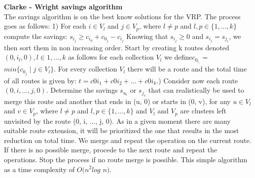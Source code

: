 \documentclass{article}
\begin{document}
\textbf{Clarke - Wright savings algorithm}\\
The savings algorithm is on the best know solutions for the VRP.
The process goes as follows:
1) For each $i \in V_l$ and $j \in V_p$, where $l \neq p$ and $l, p \in \{1,...,k\}$ compute the savings:\newline
$s_i_j \geq c_i_0 + c_0_j - c_i_j$ \newline
Knowing that $s_i_j \geq 0$ and $s_i_j = s_j_i$, we then sort them in non increasing order.\newline
Start by creating k routes denoted $(0,i_l,0), l \in 1,...,k$ as follows for each collection $V_l$ we define\newline $c_0_i__l$ = $min\{c_0_j \mid j \in V_l\}$.\newline
For every collection $V_l$ there will be a route and the total time of all routes is given by: \newline
$t = c0i_1 + c0i_2 + ... + c0i_k$.) Consider now each route $(0,i,...,j,0)$. Determine the savings $s_u_i$ or $s_j_v$ that can realistically be used to merge this route and another that ends in (u, 0) or starts in (0, v), for any $u \in V_l$ and $v \in V_p$, where $l \neq p$ and $l, p \in \{1,...,k\}$ and $V_l$ and $V_p$ are clusters left unvisited by the route (0, i, ..., j, 0).\newline
As in a given moment there are many suitable route extension, it will be prioritized the one that results in the most reduction on total time.\newline
We merge and repeat the operation on the current route. If there is no possible merge, procede to the next route and repeat the operations.
Stop the process if no route merge is possible.\newline
This simple algorithm as a time complexity of $O(n^2 log$ $n)$.
\end{document}
